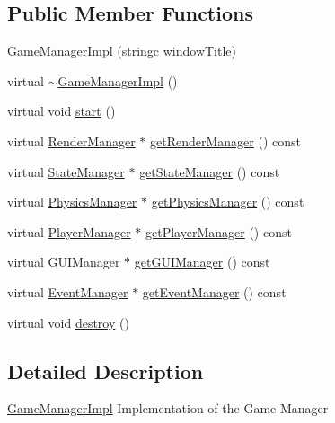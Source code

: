 \subsection*{Public Member Functions}
\begin{DoxyCompactItemize}
\item 
\hyperlink{class_micro_f_p_s_1_1_game_manager_impl_ae1b7204875900846a17d0614121a5bfb}{GameManagerImpl} (stringc windowTitle)
\item 
virtual \hyperlink{class_micro_f_p_s_1_1_game_manager_impl_a8479ea0ec07612cefcadd46d10429866}{$\sim$GameManagerImpl} ()
\item 
virtual void \hyperlink{class_micro_f_p_s_1_1_game_manager_impl_a408a6e2b5f22501b662cfd65c6437135}{start} ()
\item 
virtual \hyperlink{class_micro_f_p_s_1_1_render_manager}{RenderManager} $\ast$ \hyperlink{class_micro_f_p_s_1_1_game_manager_impl_a8d6c455d801f35c335c6648ecc2adb66}{getRenderManager} () const 
\item 
virtual \hyperlink{class_micro_f_p_s_1_1_state_manager}{StateManager} $\ast$ \hyperlink{class_micro_f_p_s_1_1_game_manager_impl_aeb67fb518616ef72d0f7b252d15908c4}{getStateManager} () const 
\item 
virtual \hyperlink{class_micro_f_p_s_1_1_physics_manager}{PhysicsManager} $\ast$ \hyperlink{class_micro_f_p_s_1_1_game_manager_impl_af22a0a2d254220f1be1b0a92963d641e}{getPhysicsManager} () const 
\item 
virtual \hyperlink{class_micro_f_p_s_1_1_player_manager}{PlayerManager} $\ast$ \hyperlink{class_micro_f_p_s_1_1_game_manager_impl_a7ae26cd86f10297b53afc17c46d8124f}{getPlayerManager} () const 
\item 
virtual GUIManager $\ast$ \hyperlink{class_micro_f_p_s_1_1_game_manager_impl_afaf6996bfa794f1d349db1c3a6e35682}{getGUIManager} () const 
\item 
virtual \hyperlink{class_micro_f_p_s_1_1_event_manager}{EventManager} $\ast$ \hyperlink{class_micro_f_p_s_1_1_game_manager_impl_a2dfeba3eead7226f599326f4dfedf768}{getEventManager} () const 
\item 
virtual void \hyperlink{class_micro_f_p_s_1_1_game_manager_impl_a223a37fd3fed8a931386a3aa0988fd99}{destroy} ()
\end{DoxyCompactItemize}


\subsection{Detailed Description}
\hyperlink{class_micro_f_p_s_1_1_game_manager_impl}{GameManagerImpl} Implementation of the Game Manager 

